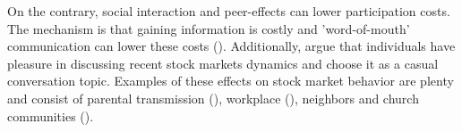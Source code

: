 \documentclass[ProjectABM]{subfiles}
\begin{document}
On the contrary, social interaction and peer-effects can lower participation costs. %
The mechanism is that gaining information is costly and 'word-of-mouth' communication can lower these costs (\cite{brown_2008}). Additionally, \cite{hong_et_al_2004social} argue that individuals have pleasure in discussing recent stock markets dynamics and choose it as a casual conversation topic. Examples of these effects on stock market behavior are plenty and consist of parental transmission (\cite{CS2000_parental}), workplace (\cite{duflo_saez2002_workplace}), neighbors and church communities (\cite{hong_et_al_2004social, brown_2008}).





\end{document}
